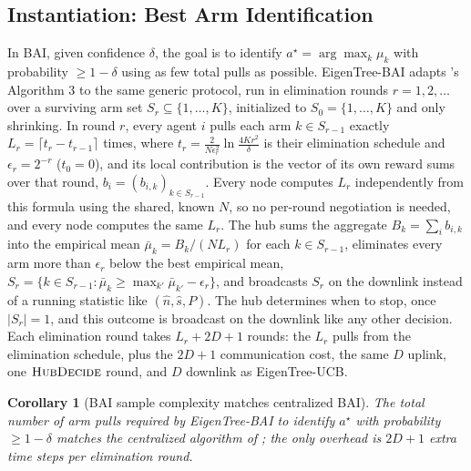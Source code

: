 \documentclass[letterpaper]{article} %
\newtheorem{corollary}{Corollary}
\begin{document}
\subsection{Instantiation: Best Arm Identification}
\label{sec:bai}

In BAI, given confidence $\delta$, the goal is to identify $a^\star =
\arg\max_k \mu_k$ with probability $\geq 1-\delta$ using as few total pulls as
possible. EigenTree-BAI adapts \citet{hillel2013distributed}'s Algorithm 3 to
the same generic protocol, run in elimination rounds $r = 1, 2, \ldots$ over a
surviving arm set $S_r \subseteq \{1,\ldots,K\}$, initialized to $S_0 =
\{1,\ldots,K\}$ and only shrinking. In round $r$, every agent $i$ pulls each
arm $k \in S_{r-1}$ exactly $L_r = \lceil t_r - t_{r-1}\rceil$ times, where
$t_r = \frac{2}{N\epsilon_r^2}\ln\frac{4Kr^2}{\delta}$ is their elimination
schedule and $\epsilon_r = 2^{-r}$ ($t_0 = 0$), and its local contribution is
the vector of its own reward sums over that round, $b_i = (b_{i,k})_{k \in
S_{r-1}}$. Every node computes $L_r$ independently from this formula using the
shared, known $N$, so no per-round negotiation is needed, and every node
computes the same $L_r$. The hub sums the aggregate $B_k = \sum_i b_{i,k}$ into
the empirical mean $\bar\mu_k = B_k / (N L_r)$ for each $k \in S_{r-1}$,
eliminates every arm more than $\epsilon_r$ below the best empirical mean, $S_r
= \{k \in S_{r-1} : \bar\mu_k \geq \max_{k'} \bar\mu_{k'} - \epsilon_r\}$, and
broadcasts $S_r$ on the downlink instead of a running statistic like $(\hat n,
\hat s, P)$. The hub determines when to stop, once $|S_r|=1$, and this outcome
is broadcast on the downlink like any other decision. Each elimination round
takes $L_r + 2D + 1$ rounds: the $L_r$ pulls from the elimination schedule, plus
the $2D+1$ communication cost, the same $D$ uplink, one $\textsc{HubDecide}$ round, and $D$
downlink as EigenTree-UCB.

\begin{corollary}[BAI sample complexity matches centralized BAI]
\label{cor:bai}
The total number of arm pulls required by EigenTree-BAI to identify $a^\star$ with
probability $\geq 1-\delta$ matches the centralized algorithm of
\citet{hillel2013distributed}; the only overhead is $2D+1$ extra time steps per
elimination round.
\end{corollary}
\end{document}
